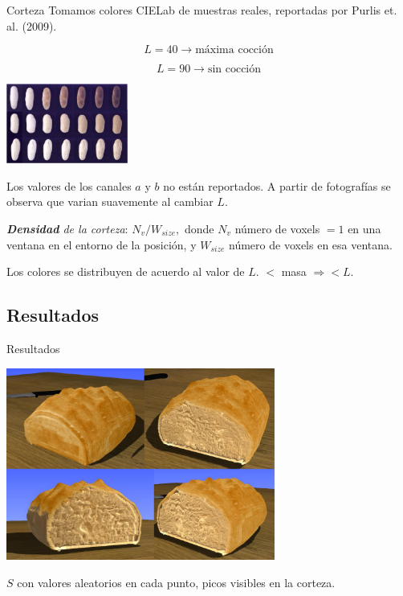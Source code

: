 \documentclass[spanish]{beamer}
\begin{document}
\begin{frame}{Corteza}
Tomamos colores CIELab de muestras reales, reportadas por Purlis et. al. (2009).

$$L = 40 \rightarrow \text{máxima cocción}$$

$$L = 90 \rightarrow \text{sin cocción}$$

\centerline{\includegraphics[width=4cm]{../figures/browning}}

\end{frame}

\begin{frame}

Los valores de los canales $a$ y $b$ no están reportados. A partir de fotografías se observa que varian suavemente al cambiar $L$.

{\em \textbf{Densidad} de la corteza}: $N_{v} / W_{size},$ donde $N_{v}$ número de voxels $= 1$ en una ventana en el entorno de la posición, y $W_{size}$ número de voxels en esa ventana.

Los colores se distribuyen de acuerdo al valor de $L$. $<$ masa $\Rightarrow < L$.

\end{frame}


\subsection{Resultados}

\begin{frame}{Resultados}

\centerline{\includegraphics[width=9cm]{../figures/Fig11}}

$S$ con valores aleatorios en cada punto, picos visibles en la corteza.

\end{frame}
\end{document}

